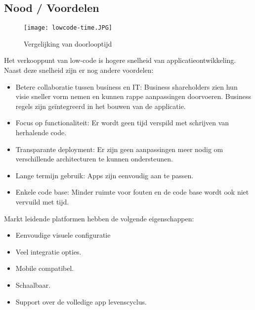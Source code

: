 \autocite{Richardson2016}

\subsection{Nood / Voordelen}

\begin{figure}[h!]
    \texttt{[image: lowcode-time.JPG]}
    \caption{Vergelijking van doorlooptijd \autocite{Richardson2016}}
    \label{fig:tijdverschil}
\end{figure}

Het verkooppunt van low-code is hogere snelheid van applicatieontwikkeling. Naast deze snelheid zijn er nog andere voordelen:
\begin{itemize}
    \item Betere collaboratie tussen business en IT: Business shareholders zien hun visie sneller vorm nemen en kunnen rappe aanpassingen doorvoeren. Business regels zijn geïntegreerd in het bouwen van de applicatie.
    \item Focus op functionaliteit: Er wordt geen tijd verspild met schrijven van herhalende code.
    \item Transparante deployment: Er zijn geen aanpassingen meer nodig om verschillende architecturen te kunnen ondersteunen.
    \item Lange termijn gebruik: Apps zijn eenvoudig aan te passen.
    \item Enkele code base: Minder ruimte voor fouten en de code base wordt ook niet vervuild met tijd.
\end{itemize} \autocite{Schetsen2016}

Markt leidende platformen hebben de volgende eigenschappen:
\begin{itemize}
    \item Eenvoudige visuele configuratie
    \item Veel integratie opties.
    \item Mobile compatibel.
    \item Schaalbaar.
    \item Support over de volledige app levenscyclus.
\end{itemize} \autocite{Kissflow2018}

